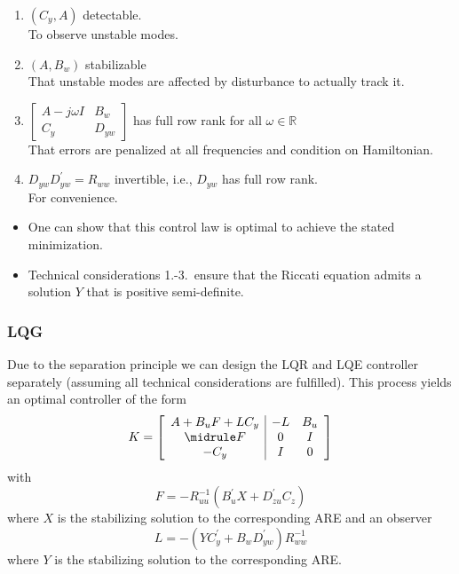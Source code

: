 \begin{enumerate}
    \item $(C_y,A)$ detectable.\\
          To observe unstable modes.
    \item $(A,B_w)$ stabilizable\\
          That unstable modes are affected by disturbance to actually track it.
    \item $\begin{bmatrix}A-j\omega I&B_w\\C_y&D_{yw}\end{bmatrix}$ has full row rank for all $\omega\in\mathbb{R}$\\
          That errors are penalized at all frequencies and condition on Hamiltonian.
    \item $D_{yw} D_{yw}^{\prime}=R_{ww}$ invertible, i.e., $D_{yw}$ has full row rank.\\
          For convenience.
\end{enumerate}


\begin{itemize}
    \item One can show that this control law is optimal to achieve the stated minimization.
    \item Technical considerations 1.-3.\ ensure that the Riccati equation admits a solution $Y$ that is positive semi-definite.
\end{itemize}

\subsubsection{LQG}
Due to the separation principle we can design the LQR and LQE controller separately (assuming all technical considerations are fulfilled). This process yields an optimal controller of the form
\begin{equation*}   %
    K=\left[\begin{array}{c|cc}
            A+B_u F+LC_y & -L & B_u \\
            \midrule
            F            & 0  & I   \\
            -C_y         & I  & 0
        \end{array}\right]
\end{equation*}
with
\begin{equation*}
    F=-R_{uu}^{-1}(B_{u}^{\prime}X+D_{zu}^{\prime}C_{z})
\end{equation*}
where $X$ is the stabilizing solution to the corresponding ARE and an observer
\begin{equation*}
    L=-(YC_y^\prime+B_w D_{yw}^\prime)R_{ww}^{-1}
\end{equation*}
where $Y$ is the stabilizing solution to the corresponding ARE.

